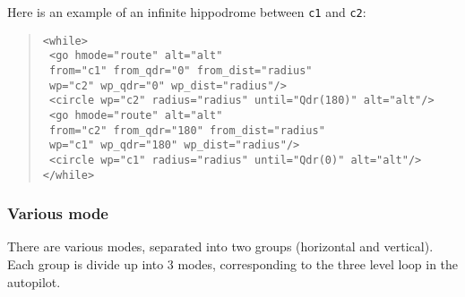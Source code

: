 \documentclass{article}
\renewcommand{\tt}[1]{\texttt{#1}}
\newcommand{\ex}[1]{\colorbox[gray]{0.92}{\tt{#1}}}
\newcommand{\hs}[1]{\hspace*{#1cm}}
\newcommand{\qt}[1]{\textcolor{gris75}{#1}}
\begin{document}
\begin{minipage}[ctb]{\textwidth}
Here is an example of an infinite hippodrome between \tt{c1} and \tt{c2}:
\begin{quote}
	\ex{<while>} \\
	\ex{\hs{0.5} <go hmode="\qt{route}" alt="\qt{alt}"} \\ 
	\ex{\hs{1.2} from="\qt{c1}" from\_qdr="\qt{0}" from\_dist="\qt{radius}"} \\
	\ex{\hs{1.2} wp="\qt{c2}" wp\_qdr="\qt{0}" wp\_dist="\qt{radius}"/>} \\
	\ex{\hs{0.5} <circle wp="\qt{c2}" radius="\qt{radius}" until="\qt{Qdr(180)}" alt="\qt{alt}"/>} \\
	\ex{\hs{0.5} <go hmode="\qt{route}" alt="\qt{alt}"} \\
	\ex{\hs{1.2} from="\qt{c2}" from\_qdr="\qt{180}" from\_dist="\qt{radius}"} \\
	\ex{\hs{1.2} wp="\qt{c1}" wp\_qdr="\qt{180}" wp\_dist="\qt{radius}"/>} \\
	\ex{\hs{0.5} <circle wp="\qt{c1}" radius="\qt{radius}" until="\qt{Qdr(0)}" alt="\qt{alt}"/>} \\
	\ex{</while>}
\end{quote}
\end{minipage}


\hypertarget{modes}{\subsubsection{Various mode}}
\label{modes2}
There are various modes, separated into two groups (horizontal and vertical).
Each group is divide up into 3 modes, corresponding to the three level loop
in the autopilot.
\end{document}
